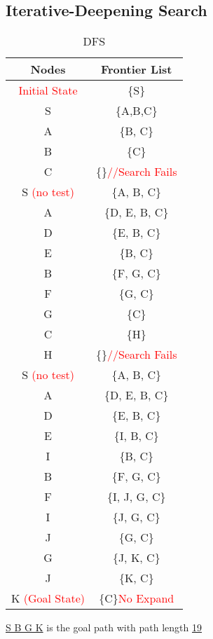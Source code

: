 \documentclass{article}
\begin{document}
	\subsection{Iterative-Deepening Search}
    \vspace{-2pc}
	\begin{table}[H]
		\centering
		\caption{DFS}
		\label{tab:table1}
		\begin{tabular}{|c|c|}
			\toprule
			Nodes & Frontier List\\
			\midrule
			\textcolor{red}{Initial State} & \{S\}\\
    		\hline
    		S & \{A,B,C\}\\
    		\hline
    		A  & \{B, C\}\\
    		\hline
    		B  & \{C\}\\
    		\hline
    		C  & \{\}\textcolor{red}{//Search Fails}\\
    		\hline
    		S \textcolor{red}{(no test)} & \{A, B, C\}\\
    		\hline
    		A  & \{D, E, B, C\}\\
            \hline
            D  & \{E, B, C\}\\
            \hline
            E  & \{B, C\}\\
            \hline
            B  & \{F, G, C\}\\
            \hline
            F  & \{G, C\}\\
            \hline
            G   & \{C\}\\
            \hline
            C   & \{H\}\\
            \hline
            H   & \{\}\textcolor{red}{//Search Fails}\\
            \hline
            S \textcolor{red}{(no test)} & \{A, B, C\}\\
            \hline
            A  & \{D, E, B, C\}\\
            \hline
            D  & \{E, B, C\}\\
            \hline
            E  & \{I, B, C\}\\
            \hline
            I   & \{B, C\}\\
            \hline
            B   & \{F, G, C\}\\
            \hline
            F   & \{I, J, G, C\}\\  		
            \hline
            I   & \{J, G, C\}\\
            \hline
            J   & \{G, C\}\\
            \hline
            G   & \{J, K, C\}\\
            \hline
            J   & \{K, C\}\\         
            \hline
            K \textcolor{red}{(Goal State)} & \{C\}\textcolor{red}{No Expand}\\
            \hline

		\end{tabular}
	\end{table}
    \underline{S B G K} is the goal path with path length \underline{19}
	\vspace{2pc}
\end{document}
